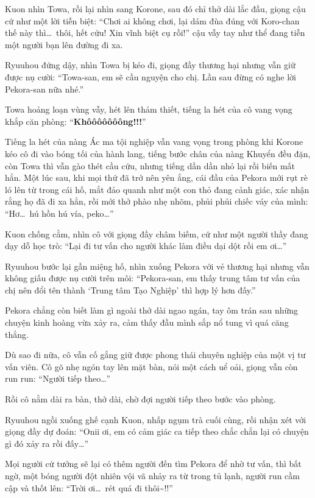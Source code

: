 \documentclass[../main.tex]{subfiles}
\begin{document}
Kuon nhìn Towa, rồi lại nhìn sang Korone, sau đó chỉ thở dài lắc đầu, giọng cậu cứ như một lời tiễn biệt: ``Chơi ai không chơi, lại dám đùa đúng với Koro-chan thế này thì\dots\ thôi, hết cứu! Xin vĩnh biệt cụ rồi!'' cậu vẫy tay như thể đang tiễn một người bạn lên đường đi xa.

Ryuuhou đứng dậy, nhìn Towa bị kéo đi, giọng đầy thương hại nhưng vẫn giữ được nụ cười: ``Towa-san, em sẽ cầu nguyện cho chị. Lần sau đừng có nghe lời Pekora-san nữa nhé.''

Towa hoảng loạn vùng vẫy, hét lên thảm thiết, tiếng la hét của cô vang vọng khắp căn phòng: ``\textbf{Khôôôôôôông!!!}''


Tiếng la hét của nàng Ác ma tội nghiệp vẫn vang vọng trong phòng khi Korone kéo cô đi vào bóng tối của hành lang, tiếng bước chân của nàng Khuyển đều đặn, còn Towa thì vẫn gào thét cầu cứu, nhưng tiếng dần dần nhỏ lại rồi biến mất hẳn. Một lúc sau, khi mọi thứ đã trở nên yên ắng, cái đầu của Pekora mới rụt rè ló lên từ trong cái hố, mắt đảo quanh như một con thỏ đang cảnh giác, xác nhận rằng họ đã đi xa hẳn, rồi mới thở phào nhẹ nhõm, phủi phủi chiếc váy của mình: ``Hơ\dots\ hú hồn hú vía, peko\dots''

Kuon chống cằm, nhìn cô với giọng đầy châm biếm, cứ như một người thầy đang dạy dỗ học trò: ``Lại đi tư vấn cho người khác làm điều dại dột rồi em ơi\dots''

Ryuuhou bước lại gần miệng hố, nhìn xuống Pekora với vẻ thương hại nhưng vẫn không giấu được nụ cười trên môi: ``Pekora-san, em thấy trung tâm tư vấn của chị nên đổi tên thành `Trung tâm Tạo Nghiệp' thì hợp lý hơn đấy.''

Pekora chẳng còn biết làm gì ngoài thở dài ngao ngán, tay ôm trán sau những chuyện kinh hoàng vừa xảy ra, cảm thấy đầu mình sắp nổ tung vì quá căng thẳng.

Dù sao đi nữa, cô vẫn cố gắng giữ được phong thái chuyên nghiệp của một vị tư vấn viên. Cô gõ nhẹ ngón tay lên mặt bàn, nói một cách uể oải, giọng vẫn còn run run: ``Người tiếp theo\dots''

Rồi cô nằm dài ra bàn, thở dài, chờ đợi người tiếp theo bước vào phòng.

Ryuuhou ngồi xuống ghế cạnh Kuon, nhấp ngụm trà cuối cùng, rồi nhận xét với giọng đầy dự đoán: ``Onii ơi, em có cảm giác ca tiếp theo chắc chắn lại có chuyện gì đó xảy ra rồi đấy\dots''

\ct

Mọi người cứ tưởng sẽ lại có thêm người đến tìm Pekora để nhờ tư vấn, thì bất ngờ, một bóng người đột nhiên vội vã nhảy ra từ trong tủ lạnh, người run cầm cập và thốt lên:
``Trời ơi\dots\ rét quá đi thôi\~{}!!''
\end{document}

